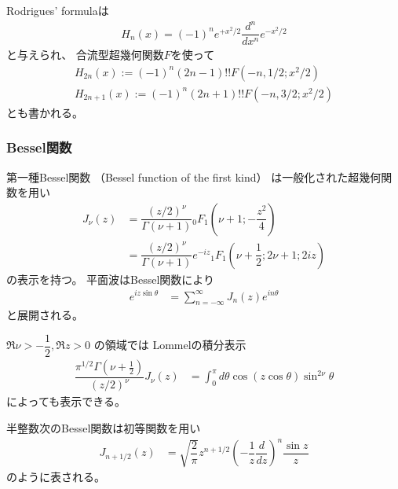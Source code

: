 Rodrigues' formulaは
\begin{align}
    H_n(x)
    =
    (-1)^n e^{ + x^2 / 2 }
    \dfrac{d^n}{dx^n}
    e^{ - x^2 / 2 }
\label{hermite rodrigues formula}
\end{align}
と与えられ、
合流型超幾何関数$F$を使って
\begin{subequations}
\begin{align}
    H_{2n}(x)
    :=
        (-1)^n
        (2 n - 1)!!
    F(-n, 1/2; x^2/2)
\\
    H_{2n+1}(x)
    :=
        (-1)^n
        (2 n + 1)!!
    F(-n, 3/2; x^2/2)
\end{align}
\end{subequations}
とも書かれる。

\subsubsection{Bessel関数}

第一種Bessel関数
（Bessel function of the first kind）
は一般化された超幾何関数を用い
\begin{subequations}
\begin{align}
    J_\nu (z)
&=
    \dfrac{ (z/2)^\nu }
        { \Gamma(\nu + 1) }
    {}_0 F_1 \left(
        \nu + 1; - \dfrac{z^2}{4}
    \right)
\\&=
    \dfrac{ (z/2)^\nu }
        { \Gamma(\nu + 1) }
    e^{- i z}
    {}_1 F_1 \left(
        \nu + \dfrac{1}{2};
        2 \nu + 1;
        2 i z
    \right)
\end{align}
\end{subequations}
の表示を持つ。
平面波はBessel関数により
\begin{align}
    e^{ i z \sin \theta }
&=
    \sum_{n = - \infty}^{\infty}
        J_n(z)
        e^{i n \theta}
\label{plane wave expanded by bessel 1st}
\end{align}
と展開される。

$\Re \nu > -\dfrac{1}{2},
\Re z > 0$
の領域では
Lommelの積分表示
\begin{align}
    \dfrac{
        \pi^{1/2}
        \Gamma(\nu + \frac{1}{2})
    }
    {(z/2)^\nu}
    J_{\nu}(z)
&=
    \int_{0}^\pi
        d \theta
        \cos (z \cos \theta)
        \sin^{2 \nu} \theta
\label{lommel integral formula for Bessel 1st}
\end{align}
によっても表示できる。

半整数次のBessel関数は初等関数を用い
\begin{align}
    J_{n + 1/2} (z)
&=
    \sqrt{ \dfrac{2}{\pi} }
    z^{n + 1/2}
    \left(
        - \dfrac{1}{z}
        \dfrac{d}{dz}
    \right)^n
    \dfrac{\sin z}{z}
\label{half integral bessel 1st w.r.t. sin}
\end{align}
のように表される。


